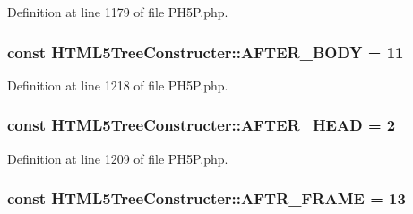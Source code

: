 Definition at line 1179 of file P\+H5\+P.\+php.

\hypertarget{classHTML5TreeConstructer_a999b3e3c17749259563c2c102e2c09e9}{
\subsubsection[{A\+F\+T\+E\+R\+\_\+\+B\+O\+D\+Y}]{\setlength{\rightskip}{0pt plus 5cm}const H\+T\+M\+L5\+Tree\+Constructer\+::\+A\+F\+T\+E\+R\+\_\+\+B\+O\+D\+Y = 11}}\label{classHTML5TreeConstructer_a999b3e3c17749259563c2c102e2c09e9}


Definition at line 1218 of file P\+H5\+P.\+php.

\hypertarget{classHTML5TreeConstructer_aa7370b9a69df3ec094e3fcb46c61ef0d}{
\subsubsection[{A\+F\+T\+E\+R\+\_\+\+H\+E\+A\+D}]{\setlength{\rightskip}{0pt plus 5cm}const H\+T\+M\+L5\+Tree\+Constructer\+::\+A\+F\+T\+E\+R\+\_\+\+H\+E\+A\+D = 2}}\label{classHTML5TreeConstructer_aa7370b9a69df3ec094e3fcb46c61ef0d}


Definition at line 1209 of file P\+H5\+P.\+php.

\hypertarget{classHTML5TreeConstructer_ac3eb8ac4105201ad4e98ce9c9a81347a}{
\subsubsection[{A\+F\+T\+R\+\_\+\+F\+R\+A\+M\+E}]{\setlength{\rightskip}{0pt plus 5cm}const H\+T\+M\+L5\+Tree\+Constructer\+::\+A\+F\+T\+R\+\_\+\+F\+R\+A\+M\+E = 13}}\label{classHTML5TreeConstructer_ac3eb8ac4105201ad4e98ce9c9a81347a}



